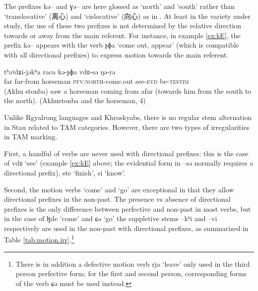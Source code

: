 \documentclass[oldfontcommands,twoside,usletter,12pt]{memoir}
\newcommand{\ipa}[1]{{\phon #1}} %
\newcommand{\zh}[1]{{\cn #1}}
\begin{document}
The prefixes \ipa{kə--} and \ipa{ɣə--} are here glossed as `north' and `south' rather than `translocative' (\zh{离心}) and  `cislocative' (\zh{向心}) as in \citet[26]{huangbf91daofu}. At least in the variety under study, the  use of these two prefixes is not determined by the relative direction towards or away from the main referent. For instance, in example \ref{ex:kE},   the prefix \ipa{kə--} appears with  the verb \ipa{ʂɸa} `come out, appear' (which is compatible with all directional prefixes) to express motion towards the main referent.

\begin{exe}
\ex \label{ex:kE}
\gll 	\ipa{tʰaˠdʑi}  	\ipa{tʰaˠdʑi-jəkʰa}  	\ipa{raca}  	\ipa{kə-ʂɸa}  	\ipa{vdʚ-sə}  	\ipa{ŋə-rə}  \\
far far-from horseman \textsc{pfv:north}-come.out see-\textsc{evd} be-\textsc{testim} \\
\glt (Akhu stonba) saw  a horseman coming from afar (towards him from the south to the north). (Akhustonba and the horseman, 4)
\end{exe}


Unlike Rgyalrong languages and Khroskyabs, there is no regular stem alternation in Stau related to TAM categories. However, there are two types of irregularities in TAM marking.

First, a handful of verbs are never used with directional prefixes: this is the case of \ipa{vdʚ} `see' (example \ref{ex:kE} above; the evidential form in --\ipa{sə} normally requires a directional prefix), \ipa{ste} `finish', \ipa{si} `know'.

Second, the motion verbs `come' and `go' are exceptional in that they allow directional prefixes in the non-past. The presence vs absence of directional prefixes is the only difference between perfective and non-past in most verbs, but in the case of \ipa{ɮde} `come' and \ipa{ɕə} `go' the suppletive stems  \ipa{--kʰi} and \ipa{--vi} respectively are used in the non-past with directional prefixes, as summarized in Table \ref{tab:motion.irr}.\footnote{There is in addition a defective motion verb \ipa{rja} `leave' only used in the third person perfective form; for the first and second person, corresponding forms of the verb \ipa{ɕə} must be used instead.}
\end{document}
